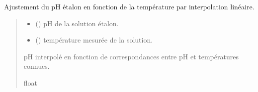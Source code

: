 \documentclass[letterpaper,10pt,french]{sphinxmanual}
\begin{document}

\begin{fulllineitems}
\label{\detokenize{library:lib_pH.pH_temp_adjust}}
\pysigstartsignatures
\pysiglinewithargsret
{}
{\sphinxparamcomma {}}
{}
\pysigstopsignatures
\sphinxAtStartPar
Ajustement du pH étalon en fonction de la température par interpolation linéaire.
\begin{quote}\begin{description}
\begin{itemize}
\item {} 
\sphinxAtStartPar
{} () \textendash{} pH de la solution étalon.

\item {} 
\sphinxAtStartPar
{} () \textendash{} température mesurée de la solution.

\end{itemize}

\sphinxAtStartPar
{} \textendash{} pH interpolé en fonction de correspondances entre pH et températures connues.

\sphinxAtStartPar
float

\end{description}\end{quote}

\end{fulllineitems}

\end{document}
